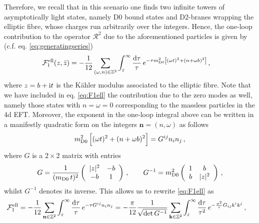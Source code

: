 Therefore, we recall that in this scenario one finds two infinite towers of asymptotically light states, namely D0 bound states and D2-branes wrapping the elliptic fibre, whose charges run arbitrarily over the integers. Hence, the one-loop contribution to the operator $\mathcal{R}^2$ due to the aforementioned particles is given by (c.f. eq. \eqref{eq:generatingseries})
%
\begin{align}
\label{eq:F1ell}
	\mathcal{F}^{\rm ell}_{1} (z,\bar z)&= -\frac{1}{12} \sum_{(\omega, n) \in \mathbb{Z}^2} \int_{\varepsilon}^{\infty} \frac{{\rm d}\tau}{\tau}\, e^{-\tau m_{\rm D0}^2\left[ (\omega t)^2+(n+ \omega b)^2\right]}\, ,
\end{align}
%
where $z=b+ \text{i} t$ is the K\"ahler modulus associated to the elliptic fibre. Note that we have included in eq. \eqref{eq:F1ell} the contribution due to the zero modes as well, namely those states with $n=\omega=0$ corresponding to the massless particles in the 4d EFT. %
Moreover, the exponent in the one-loop integral above can be written in a manifestly quadratic form on the integers $\mathbf{n}=(n, \omega)$ as follows
%
\begin{align}
	m_{\rm D0}^2 \left[(\omega t)^2+(n+ \omega b)^2\right] = G^{ij}n_i n_j\, , 
\end{align}
%
where $G$ is a $2\times 2$ matrix with entries
%
\begin{align}
	 G= \frac{1}{(m_{\rm D0}\, t)^2} \left( \begin{array}{cc}
				|z|^2 & -b  \\
				-b & 1  \\
			\end{array} \right)\, , \qquad G^{-1}= m_{\rm D0}^2
 			\left( \begin{array}{cc}
				1 & b  \\
				b & |z|^2  \\
			\end{array} \right)\, ,
\end{align}
%
whilst $G^{-1}$ denotes its inverse. This allows us to rewrite \eqref{eq:F1ell} as
%
\begin{align}
	\mathcal{F}^{\rm ell}_{1}&= -\frac{1}{12} \sum_{\mathbf{n}\in \mathbb{Z}^2} \int_{\varepsilon}^{\infty} \frac{{\rm d}\tau}{\tau}\, e^{-\tau G^{ij}n_i n_j} = -\frac{\pi}{12} \frac{1}{\sqrt{\det G^{-1}}} \sum_{\mathbf{k}\in \mathbb{Z}^2} \int_{\varepsilon}^{\infty} \frac{{\rm d}\tau}{\tau^2}\, e^{-\frac{\pi^2}{\tau} G_{ij}k^i k^j}\, ,
\end{align}
